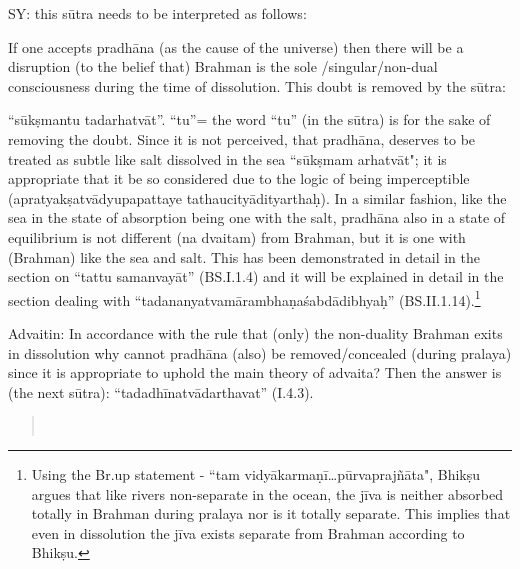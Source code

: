 SY: this sūtra needs to be interpreted as follows:

If one accepts pradhāna (as the cause of the universe) then there will be a disruption (to the belief that) Brahman is the sole /singular/non-dual consciousness during the time of dissolution. This doubt is removed by the sūtra: 

“sūkṣmantu tadarhatvāt”. “tu”= the word “tu” (in the sūtra) is for the sake of removing the doubt. Since it is not perceived, that pradhāna, deserves to be treated as subtle like salt dissolved in the sea ``sūkṣmam arhatvāt"; it is appropriate that it be so considered due to the logic of being imperceptible  (apratyakṣatvādyupapattaye tathaucityādityarthaḥ). In a similar fashion, like the sea in the state of absorption being one with the salt, pradhāna also in a state of equilibrium is not different (na dvaitam) from Brahman, but it is one with (Brahman) like the sea and salt. This has been demonstrated in detail in the section on “tattu samanvayāt” (BS.I.1.4) and it will be explained in detail in the section dealing with “tadananyatvamārambhaṇaśabdādibhyaḥ” (BS.II.1.14).\footnote{Using the Br.up statement - ``tam vidyākarmaṇī…pūrvaprajñāta", Bhikṣu argues that like rivers non-separate in the ocean, the jīva is neither absorbed totally in Brahman during pralaya nor is it totally separate. This implies that even in dissolution the jīva exists separate from Brahman according to Bhikṣu.}

Advaitin: In accordance with the rule that (only) the non-duality Brahman exits in dissolution why cannot pradhāna (also) be removed/con\-cealed (during pralaya) since it is appropriate to uphold the main theory of advaita? Then the answer is (the next sūtra): “tadadhīnatvādarthavat” (I.4.3).

\textbf{}


\begin{verse}
\\
\end{verse}


